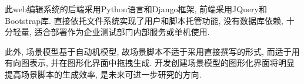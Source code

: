             此web编辑系统的后端采用Python语言和Django框架, 前端采用JQuery和Bootstrap库. 直接依托文件系统实现了用户和脚本托管功能, 没有数据库依赖, 十分轻量, 适合部署作为企业测试部门内部服务或单机使用.
        
            此外, 场景模型基于自动机模型, 故场景脚本不适于采用直接撰写的形式, 而适于用有向图表示, 并在图形化界面中拖拽生成\cite{junyiw17}. 开发创建场景模型的图形化界面将明显提高场景脚本的生成效率, 是未来可进一步研究的方向.
            


